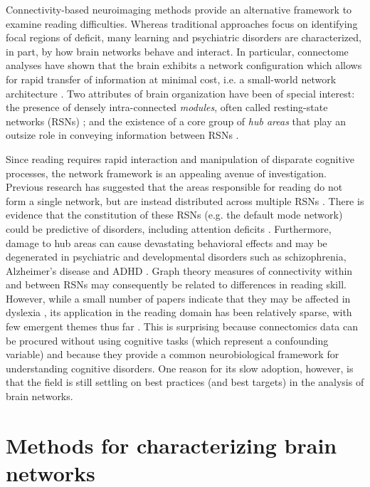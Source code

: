Connectivity-based neuroimaging methods provide an alternative framework to examine reading difficulties. Whereas traditional approaches focus on identifying focal regions of deficit, many learning and psychiatric disorders are characterized, in part, by how brain networks behave and interact. In particular, connectome analyses have shown that the brain exhibits a network configuration which allows for rapid transfer of information at minimal cost, i.e. a small-world network architecture \citep{Bullmore2012}. Two attributes of brain organization have been of special interest: the presence of densely intra-connected \textit{modules}, often called resting-state networks (RSNs) \citep{Sporns2016}; and the existence of a core group of \textit{hub areas} that play an outsize role in conveying information between RSNs \citep{VandenHeuvel2011}. 

Since reading requires rapid interaction and manipulation of disparate cognitive processes, the network framework is an appealing avenue of investigation. Previous research has suggested that the areas responsible for reading do not form a single network, but are instead distributed across multiple RSNs \citep{Vogel2013}. There is evidence that the constitution of these RSNs (e.g. the default mode network) could be predictive of disorders, including attention deficits \citep{Uddin2008}. Furthermore, damage to hub areas can cause devastating behavioral effects \citep{Warren2014} and may be degenerated in psychiatric and developmental disorders such as schizophrenia, Alzheimer's disease and ADHD \citep{Stam2014}. Graph theory measures of connectivity within and between RSNs may consequently be related to differences in reading skill. However, while a small number of papers indicate that they may be affected in dyslexia \citep{Qi2016, Finn2014}, its application in the reading domain has been relatively sparse, with few emergent themes thus far \citep{Cao2016}. This is surprising because connectomics data can be procured without using cognitive tasks (which represent a confounding variable) and because they provide a common neurobiological framework for understanding cognitive disorders. One reason for its slow adoption, however, is that the field is still settling on best practices (and best targets) in the analysis of brain networks. 

\section{Methods for characterizing brain networks}

